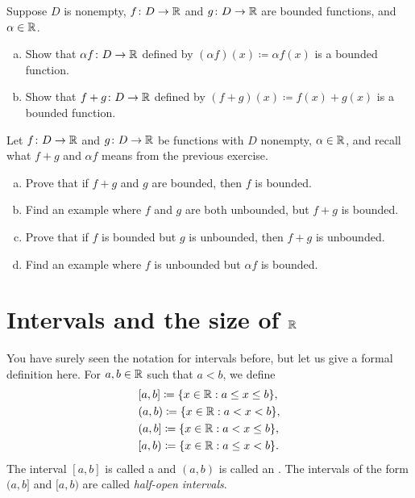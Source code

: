 \begin{exercise}
\pagebreak[2]
Suppose $D$ is nonempty, $f \colon D \to {\mathbb{R}}$ and $g \colon D \to {\mathbb{R}}$ are
bounded functions, and
$\alpha \in {\mathbb{R}}$.
\begin{enumerate}[a)]
\item
Show that $\alpha f \colon D \to {\mathbb{R}}$ defined by $(\alpha f) (x) \coloneqq \alpha
f(x)$ is a bounded function.
\item
Show that $f+g \colon D \to {\mathbb{R}}$ defined by $(f+g) (x) \coloneqq f(x) + g(x)$
is a bounded function.
\end{enumerate}
\end{exercise}

\begin{exercise}
Let $f \colon D \to {\mathbb{R}}$ and $g \colon D \to {\mathbb{R}}$ be functions with $D$
nonempty, $\alpha \in {\mathbb{R}}$, and
recall what $f+g$ and $\alpha f$ means from the previous exercise.
\begin{enumerate}[a)]
\item
Prove that if $f+g$ and $g$ are bounded, then $f$ is bounded.
\item
Find an example where $f$ and $g$ are both unbounded, but $f+g$ is
bounded.
\item
Prove that if $f$ is bounded but $g$ is unbounded, then $f+g$ is
unbounded.
\item
Find an example where $f$ is unbounded but $\alpha f$ is bounded.
\end{enumerate}
\end{exercise}


\sectionnewpage
\section{Intervals and the size of \texorpdfstring{${\mathbb{R}}$}{R}}
\label{sec:intandsizeR}


You have surely seen the notation for intervals
before, but let us give a formal
definition here.  For $a, b \in {\mathbb{R}}$ such that $a < b$, we define
%
%
%
%
%
\begin{align*}
& [a,b] \coloneqq \{ x \in {\mathbb{R}} : a \leq x \leq b \}, \\
& (a,b) \coloneqq \{ x \in {\mathbb{R}} : a < x < b \}, \\
& (a,b] \coloneqq \{ x \in {\mathbb{R}} : a < x \leq b \}, \\
& [a,b) \coloneqq \{ x \in {\mathbb{R}} : a \leq x < b \} .
\end{align*}
The interval $[a,b]$ is called a \emph{}
and $(a,b)$ is called an \emph{}.  The intervals
of the form $(a,b]$ and $[a,b)$ are called
\emph{half-open intervals}.

